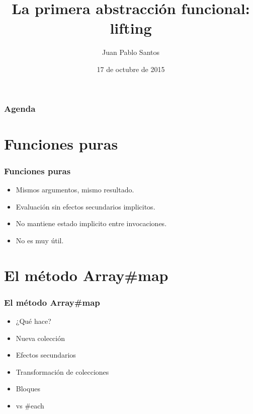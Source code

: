 \documentclass{beamer}
\begin{document}
\title{La primera abstracción funcional: lifting}
\author{Juan Pablo Santos}
\date{17 de octubre de 2015}

\begin{frame}
  \titlepage
\end{frame}

\begin{frame}
  \frametitle{Agenda}
  \tableofcontents
\end{frame}

\section{Funciones puras}
\begin{frame}
  \frametitle{Funciones puras}
  \begin{itemize}
    \item Mismos argumentos, mismo resultado.
    \item Evaluación sin efectos secundarios implicitos.
    \item No mantiene estado implicito entre invocaciones.
    \item No es muy útil.
  \end{itemize}
\end{frame}

\section{El método Array\#map}
\begin{frame}
  \frametitle{El método Array\#map}
  \begin{itemize}
    \item ¿Qué hace?
    \item Nueva colección
    \item Efectos secundarios
    \item Transformación de colecciones
    \item Bloques
    \item vs \#each
  \end{itemize}

\end{frame}
\end{document}

